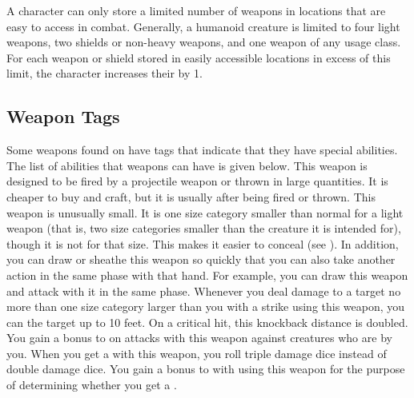         A character can only store a limited number of weapons in locations that are easy to access in combat.
        Generally, a humanoid creature is limited to four light weapons, two shields or non-heavy weapons, and one weapon of any usage class.
        For each weapon or shield stored in easily accessible locations in excess of this limit, the character increases their  by 1.

    \subsection{Weapon Tags}\label{Weapon Tags}
        Some weapons found on  have tags that indicate that they have special abilities. The list of abilities that weapons can have is given below.
         This weapon is designed to be fired by a projectile weapon or thrown in large quantities.
        It is cheaper to buy and craft, but it is usually  after being fired or thrown.
         This weapon is unusually small.
        It is one size category smaller than normal for a light weapon (that is, two size categories smaller than the creature it is intended for), though it is not  for that size.
        This makes it easier to conceal (see ).
        In addition, you can draw or sheathe this weapon so quickly that you can also take another action in the same phase with that hand.
        For example, you can draw this weapon and attack with it in the same phase.
         Whenever you deal damage to a target no more than one size category larger than you with a strike using this weapon, you can  the target up to 10 feet.
        On a critical hit, this knockback distance is doubled.
         You gain a  bonus to  on  attacks with this weapon against creatures who are \grappled by you.
         When you get a  with this weapon, you roll triple damage dice instead of double damage dice.
         You gain a  bonus to  with  using this weapon for the purpose of determining whether you get a .
